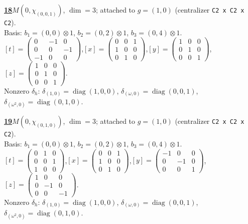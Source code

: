 \begin{samepage}\noindent\textbf{\underline{18}}\quad $M(0,\chi_{(0,0,1)})$, $\dim=3$; attached to $g=(1,0)$ (centralizer \texttt{C2 x C2 x C2}).\\
Basis: $b_{1}=(0,0)\otimes 1$, $b_{2}=(0,2)\otimes 1$, $b_{3}=(0,4)\otimes 1$.\\
$[t]=\left(\begin{smallmatrix} 0 & -1 & 0 \\ 0 & 0 & -1 \\ -1 & 0 & 0 \end{smallmatrix}\right)$,\quad $[x]=\left(\begin{smallmatrix} 0 & 0 & 1 \\ 1 & 0 & 0 \\ 0 & 1 & 0 \end{smallmatrix}\right)$,\quad $[y]=\left(\begin{smallmatrix} 1 & 0 & 0 \\ 0 & 1 & 0 \\ 0 & 0 & 1 \end{smallmatrix}\right)$,\quad $[z]=\left(\begin{smallmatrix} 1 & 0 & 0 \\ 0 & 1 & 0 \\ 0 & 0 & 1 \end{smallmatrix}\right)$.\\
Nonzero $\delta_h$: $\delta_{(1,0)}=\operatorname{diag}(1,0,0)$, $\delta_{(\omega,0)}=\operatorname{diag}(0,0,1)$, $\delta_{(\omega^2,0)}=\operatorname{diag}(0,1,0)$.\end{samepage}
\medskip

\begin{samepage}\noindent\textbf{\underline{19}}\quad $M(0,\chi_{(0,1,0)})$, $\dim=3$; attached to $g=(1,0)$ (centralizer \texttt{C2 x C2 x C2}).\\
Basis: $b_{1}=(0,0)\otimes 1$, $b_{2}=(0,2)\otimes 1$, $b_{3}=(0,4)\otimes 1$.\\
$[t]=\left(\begin{smallmatrix} 0 & 1 & 0 \\ 0 & 0 & 1 \\ 1 & 0 & 0 \end{smallmatrix}\right)$,\quad $[x]=\left(\begin{smallmatrix} 0 & 0 & 1 \\ 1 & 0 & 0 \\ 0 & 1 & 0 \end{smallmatrix}\right)$,\quad $[y]=\left(\begin{smallmatrix} -1 & 0 & 0 \\ 0 & -1 & 0 \\ 0 & 0 & 1 \end{smallmatrix}\right)$,\quad $[z]=\left(\begin{smallmatrix} 1 & 0 & 0 \\ 0 & -1 & 0 \\ 0 & 0 & -1 \end{smallmatrix}\right)$.\\
Nonzero $\delta_h$: $\delta_{(1,0)}=\operatorname{diag}(1,0,0)$, $\delta_{(\omega,0)}=\operatorname{diag}(0,0,1)$, $\delta_{(\omega^2,0)}=\operatorname{diag}(0,1,0)$.\end{samepage}
\medskip

